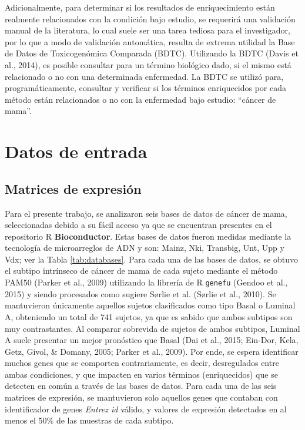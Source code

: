 \documentclass[12pt,twoside]{reedthesis}
\begin{document}
Adicionalmente, para determinar si los resultados de enriquecimiento están realmente relacionados con la condición bajo estudio, se requerirá una validación manual de la literatura, lo cual suele ser una tarea tediosa para el investigador, por lo que a modo de validación automática, resulta de extrema utilidad la Base de Datos de Toxicogenómica Comparada (BDTC). Utilizando la BDTC (Davis et al., 2014), es posible consultar para un término biológico dado, si el mismo está relacionado o no con una determinada enfermedad. La BDTC se utilizó para, programáticamente, consultar y verificar si los términos enriquecidos por cada método están relacionados o no con la enfermedad bajo estudio: ``cáncer de mama''.

\hypertarget{datos-de-entrada}{%
\section{Datos de entrada}\label{datos-de-entrada}}

\hypertarget{matrices-de-expresiuxf3n}{%
\subsection{Matrices de expresión}\label{matrices-de-expresiuxf3n}}

Para el presente trabajo, se analizaron seis bases de datos de cáncer de mama, seleccionadas debido a su fácil acceso ya que se encuentran presentes en el repositorio R \textbf{Bioconductor}. Estas bases de datos fueron medidas mediante la tecnología de microarreglos de ADN y son: Mainz, Nki, Transbig, Unt, Upp y Vdx; ver la Tabla \ref{tab:databases}. Para cada una de las bases de datos, se obtuvo el subtipo intrínseco de cáncer de mama de cada sujeto mediante el método PAM50 (Parker et al., 2009) utilizando la librería de R \texttt{genefu} (Gendoo et al., 2015) y siendo procesados como sugiere Sørlie et al. (Sørlie et al., 2010). Se mantuvieron únicamente aquellos sujetos clasificados como tipo Basal o Luminal A, obteniendo un total de 741 sujetos, ya que es sabido que ambos subtipos son muy contrastantes. Al comparar sobrevida de sujetos de ambos subtipos, Luminal A suele presentar un mejor pronóstico que Basal (Dai et al., 2015; Ein-Dor, Kela, Getz, Givol, \& Domany, 2005; Parker et al., 2009). Por ende, se espera identificar muchos genes que se comporten contrariamente, es decir, desregulados entre ambas condiciones, y que impacten en varios términos (enriquecidos) que se detecten en común a través de las bases de datos. Para cada una de las seis matrices de expresión, se mantuvieron solo aquellos genes que contaban con identificador de genes \emph{Entrez id} válido, y valores de expresión detectados en al menos el 50\% de las muestras de cada subtipo.
\end{document}
